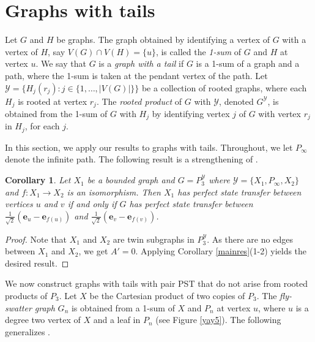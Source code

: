 \documentclass[12pt,a4paper]{article}
\newtheorem{cor}{Corollary}
\def \e {{\bf e}}
\def \e {{\mathbf e}}
\begin{document}
\section{Graphs with tails}
\label{gwt}

Let $G$ and $H$ be graphs. The graph obtained by identifying a vertex of $G$ with a vertex of $H$, say $V(G)\cap V(H)=\{u\}$, is called the \textit{1-sum} of $G$ and $H$ at vertex $u$. We say that $G$ is a \textit{graph with a tail} if $G$ is a 1-sum of a graph and a path, where the 1-sum is taken at the pendant vertex of the path. Let $\mathcal{Y}=\{H_j(r_j):j\in\{1,\ldots,|V(G)|\}\}$ be a collection of rooted graphs, where each $H_j$ is rooted at vertex $r_j$. The \textit{rooted product} of $G$ with $\mathcal{Y}$, denoted $G^\mathcal{Y}$, is obtained from the 1-sum of $G$ with $H_j$ by identifying vertex $j$ of $G$ with vertex $r_j$ in $H_j$, for each $j$.

In this section, we apply our results to graphs with tails. Throughout, we let $P_{\infty}$ denote the infinite path. The following result is a strengthening of \cite[Theorem 15]{bernard2025quantum}.

\begin{cor}
\label{aak}
Let $X_1$ be a bounded graph and $G=P_3^\mathcal{Y}$ where $\mathcal{Y}=\{X_1,P_{\infty},X_2\}$ and $f:X_1\rightarrow X_2$ is an isomorphism. Then $X_1$ has perfect state transfer between vertices $u$ and $v$ if and only if $G$ has perfect state transfer between $\frac{1}{\sqrt{2}}(\e_u-\e_{f(u)})$ and $\frac{1}{\sqrt{2}}(\e_v-\e_{f(v)})$.
\end{cor}

\begin{proof}
Note that $X_1$ and $X_2$ are twin subgraphs in $P_3^\mathcal{Y}$. As there are no edges between $X_1$ and $X_2$, we get $A'=0$.  Applying Corollary \ref{mainres}(1-2) yields the desired result.
\end{proof}

We now construct graphs with tails with pair PST that do not arise from rooted products of $P_3$. Let $X$ be the Cartesian product of two copies of $P_3$. The \textit{fly-swatter graph} $G_n$ is obtained from a 1-sum of $X$ and $P_n$ at vertex $u$, where $u$ is a degree two vertex of $X$ and a leaf in $P_n$ (see Figure \ref{yay5}). The following generalizes \cite[Example 11]{bernard2025quantum}.
\end{document}
